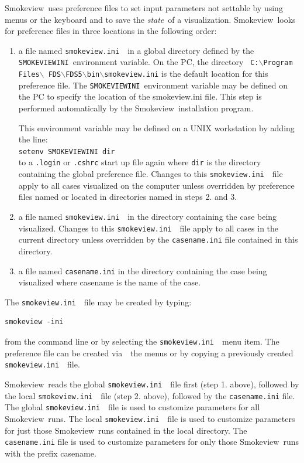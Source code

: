 \documentclass[11pt,twoside]{book}
\newcommand{\svini}{{\tt smokeview.ini}\ }
\newcommand{\Smokeview}{{Smokeview}}
\newcommand{\smokeview}{{Smokeview}}
\newcommand{\via}{{via\ }}
\begin{document}
\Smokeview\ uses preference files to set input parameters not
settable by using menus or the keyboard and to save the {\em state}\
of a visualization. \Smokeview\ looks for preference files in
three locations in the following order:
\begin{enumerate}

\item a file named \svini\ in a global directory
defined by the {\tt SMOKEVIEWINI}\ environment variable. On the PC,
the directory
{\tt
C:$\backslash$Program Files$\backslash$ FDS$\backslash$FDS5$\backslash$bin$\backslash$smokeview.ini} is the
default location for this preference file. The {\tt SMOKEVIEWINI}\
environment variable may be defined on the
PC to specify the location of the smokeview.ini file. This
step is performed automatically by the \smokeview\ installation
program.

This environment variable may be
defined on a UNIX workstation by adding the line:\\

{\tt setenv SMOKEVIEWINI dir} \\

to a {\tt .login}  or {\tt .cshrc} start up file
again where {\tt dir} is the directory containing the
global preference file. Changes to this \svini\
file apply to all cases visualized on the computer unless
overridden by preference files named or located in
directories named in steps 2. and  3.

\item a file named \svini\ in the directory
containing the case being visualized.  Changes to this \svini\ file apply to all cases in the current
directory unless overridden by the {\tt casename.ini} file
contained in this directory.

\item a file named {\tt casename.ini} in the directory containing the case being
visualized where casename is the name of the case.
\end{enumerate}

The \svini\ file may be created by typing:
\begin{verbatim}
smokeview -ini
\end{verbatim}
\noindent from the command line or by selecting the \svini\ menu item. The 
preference file can be created \via\ the menus or by copying a
previously created \svini\ file.

\Smokeview\ reads the global \svini\ file first (step 1. above),
followed by the local \svini\ file (step 2. above),
followed by the {\tt casename.ini} file.
The global \svini\ file is used to customize parameters for all \smokeview\ runs.
The local \svini\  file is used to customize parameters for just those \smokeview\ runs
contained in the local directory.
The {\tt casename.ini} file is used to customize parameters for only
those \smokeview\ runs with the prefix casename.
\end{document}

